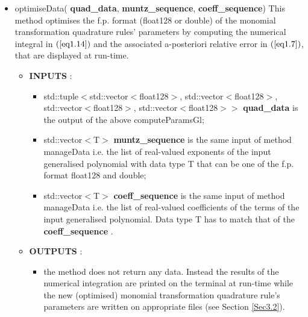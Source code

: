 \documentclass[a4paper, twosided]{book}
\begin{document}
\begin{itemize}
    \item \colorbox{poliGrayBlue}{optimiseData}(\color{poliDarkBlue} \textbf{quad\_data}\color{black}, \color{poliDarkBlue} \textbf{muntz\_sequence}\color{black}, \color{poliDarkBlue} \textbf{coeff\_sequence}\color{black})
    \newline This method optimises the f.p. format (\colorbox{poliGrayBlue}{float128} or \colorbox{poliGrayBlue}{double}) of the 
    monomial transformation quadrature rules' parameters by computing the numerical integral in $(\ref{eq1.14})$ and the associated a-posteriori relative error in $(\ref{eq1.7})$, that are displayed at run-time. 
    \begin{itemize}
        \item \color{poliDarkBlue} \textbf{INPUTS} \color{black}:
        \begin{itemize}
            \item \colorbox{poliGrayBlue}{std::tuple$<$std::vector$<$float128$>$, std::vector$<$float128$>$, std::vector$<$float128$>$, std::vector$<$float128$>>$} \color{poliDarkBlue} \textbf{quad\_data} \color{black} is the output of the above \colorbox{poliGrayBlue}{computeParamsGl};
            \item \colorbox{poliGrayBlue}{std::vector$<$T$>$} \color{poliDarkBlue} \textbf{muntz\_sequence} \color{black} is the same input of method \colorbox{poliGrayBlue}{manageData} i.e. the list of real-valued exponents of the input generalised polynomial with data type \colorbox{poliGrayBlue}{T} that can be one of the f.p. format \colorbox{poliGrayBlue}{float128} and \colorbox{poliGrayBlue}{double};
            \item \colorbox{poliGrayBlue}{std::vector$<$T$>$} \color{poliDarkBlue} \textbf{coeff\_sequence} \color{black} is the same input of method \colorbox{poliGrayBlue}{manageData} i.e. the list of real-valued coefficients of the terms of the input generalised polynomial. Data type \colorbox{poliGrayBlue}{T} has to match that of the \color{poliDarkBlue} \textbf{coeff\_sequence} \color{black}.
        \end{itemize}
        \item \color{poliDarkBlue} \textbf{OUTPUTS} \color{black}:
        \begin{itemize}
            \item the method does not return any data. Instead the results of the numerical integration are printed on the terminal at run-time while the new (optimised) monomial transformation quadrature rule's parameters are written on appropriate files (see Section \ref{Sec3.2}).
        \end{itemize}
    \end{itemize}
\end{itemize}
\end{document}
